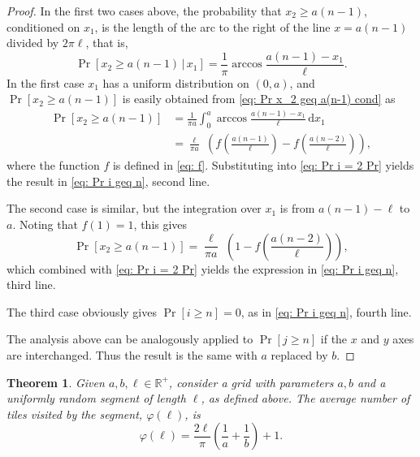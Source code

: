 \documentclass[12pt, a4paper]{article}
\newcommand{\cond}{\,|\,} %
\newcommand{\diff}{\,\mathrm d}
\newcommand{\funta}{\varphi} %
\newcommand{\len}{\ell} %
\newcommand{\touched}{visited}
\newtheorem{theorem}{Theorem}%
\begin{document}
\begin{proof}
In the first two cases above, the probability that $x_2 \geq a(n-1)$, conditioned on $x_1$, is the length of the arc to the right of the line $x=a(n-1)$ divided by $2\pi\len$, that is,
\begin{equation}
\label{eq: Pr x_2 geq a(n-1) cond}
\Pr[x_2 \geq a(n-1) \cond x_1] = \frac 1 \pi \arccos \frac{a(n-1)-x_1}{\len}.
\end{equation}
In the first case $x_1$ has a uniform distribution on $(0,a)$, and $\Pr[x_2 \geq a(n-1)]$ is easily obtained from \eqref{eq: Pr x_2 geq a(n-1) cond} as
\begin{equation}
\label{eq: Pr x_2 geq a(n-1), first case}
\begin{split}
\Pr[x_2 \geq a(n-1)] &= \frac 1 {\pi a} \int_0^a\arccos \frac{a(n-1)-x_1}{\len} \diff x_1 \\
&= \frac{\len}{\pi a}\,\, \left( f\left( \frac{a(n-1)}{\len} \right) - f\left( \frac{a(n-2)}{\len} \right) \right),
\end{split}
\end{equation}
where the function $f$ is defined in \eqref{eq: f}. Substituting into \eqref{eq: Pr i = 2 Pr} yields the result in \eqref{eq: Pr i geq n}, second line.

The second case is similar, but the integration over $x_1$ is from $a(n-1)-\len$ to $a$. Noting that $f(1)=1$, this gives
\begin{equation}
\label{eq: Pr x_2 geq a(n-1), second case}
\Pr[x_2 \geq a(n-1)] = \frac{\len}{\pi a}\,\, \left( 1 - f\left( \frac{a(n-2)}{\len} \right) \right),
\end{equation}
which combined with \eqref{eq: Pr i = 2 Pr} yields the expression in \eqref{eq: Pr i geq n}, third line.

The third case obviously gives $\Pr[i \geq n] = 0$, as in \eqref{eq: Pr i geq n}, fourth line.

The analysis above can be analogously applied to $\Pr[j \geq n]$ if the $x$ and $y$ axes are interchanged. Thus the result is the same with $a$ replaced by $b$.
\end{proof}

\begin{theorem}
\label{theo: funta, form}
Given $a, b, \len \in \mathbb R^+$, consider a grid with parameters $a, b$ and a uniformly random segment of length $\len$, as defined above. The average number of tiles \touched{} by the segment, $\funta(\len)$, is 
\begin{equation}
\label{eq: funta, form}
\funta(\len) = \frac{2\len}{\pi}\left(\frac 1 a + \frac 1 b\right) + 1.
\end{equation}
\end{theorem}
\end{document}
